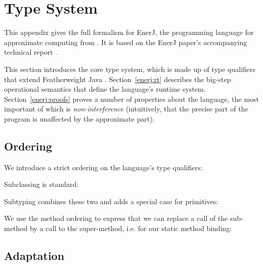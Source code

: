 \section{Type System}
\label{enerj:typesystem}

This appendix gives the full formalism for EnerJ, the programming language for
approximate computing from .
It is based on the EnerJ paper's accompanying technical
report~\cite{enerj-tr}.

This section introduces the core type system, which is made up of type
qualifiers that extend Featherweight Java \cite{fjava}. Section~\ref{enerj:rt}
describes the big-step operational semantics that define the language's runtime
system. Section~\ref{enerj:proofs} proves a number of properties about the language,
the most important of which is \emph{non-interference} (intuitively, that the
precise part of the program is unaffected by the approximate part).


\subsection{Ordering}

We introduce a strict ordering on the language's type qualifiers:

\vspace{0.5ex}
\ottdefnqorder{}
\vspace{2.0ex}


Subclassing is standard:

\vspace{0.5ex}
\ottdefnsubclassing{}
\vspace{2.0ex}


Subtyping combines these two and adds a special case for primitives:

\vspace{0.5ex}
\ottdefnsubtyping{}
\vspace{2.0ex}


We use the method ordering to express that we can replace a call of
the sub-method by a call to the super-method, i.e. for our static
method binding:

\vspace{0.5ex}
\ottdefnmethodsubtyping{}
\vspace{2.0ex}


\subsection{Adaptation}

